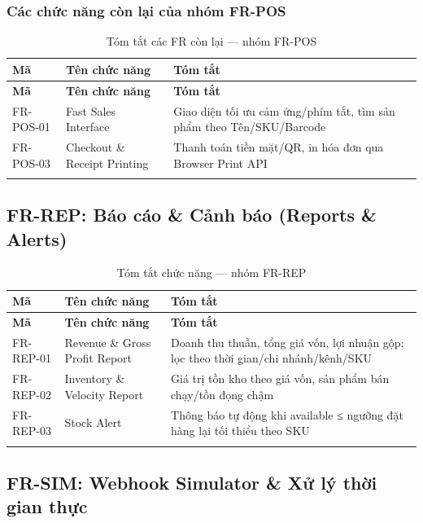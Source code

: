 \subsubsection{Các chức năng còn lại của nhóm FR-POS}

\begin{longtable}{|p{2cm}|p{4.5cm}|p{7cm}|}
    \hline
    \textbf{Mã} & \textbf{Tên chức năng} & \textbf{Tóm tắt} \\
    \hline
    \endfirsthead
    \hline
    \textbf{Mã} & \textbf{Tên chức năng} & \textbf{Tóm tắt} \\
    \hline
    \endhead
    FR-POS-01 & Fast Sales Interface & Giao diện tối ưu cảm ứng/phím tắt, tìm sản phẩm theo Tên/SKU/Barcode \\
    \hline
    FR-POS-03 & Checkout \& Receipt Printing & Thanh toán tiền mặt/QR, in hóa đơn qua Browser Print API \\
    \hline
    \caption{Tóm tắt các FR còn lại — nhóm FR-POS}
\end{longtable}

\subsection{FR-REP: Báo cáo \& Cảnh báo (Reports \& Alerts)}

\begin{longtable}{|p{2cm}|p{4.5cm}|p{7cm}|}
    \hline
    \textbf{Mã} & \textbf{Tên chức năng} & \textbf{Tóm tắt} \\
    \hline
    \endfirsthead
    \hline
    \textbf{Mã} & \textbf{Tên chức năng} & \textbf{Tóm tắt} \\
    \hline
    \endhead
    FR-REP-01 & Revenue \& Gross Profit Report & Doanh thu thuần, tổng giá vốn, lợi nhuận gộp; lọc theo thời gian/chi nhánh/kênh/SKU \\
    \hline
    FR-REP-02 & Inventory \& Velocity Report & Giá trị tồn kho theo giá vốn, sản phẩm bán chạy/tồn đọng chậm \\
    \hline
    FR-REP-03 & Stock Alert & Thông báo tự động khi available ≤ ngưỡng đặt hàng lại tối thiểu theo SKU \\
    \hline
    \caption{Tóm tắt chức năng — nhóm FR-REP}
\end{longtable}

\subsection{FR-SIM: Webhook Simulator \& Xử lý thời gian thực}

